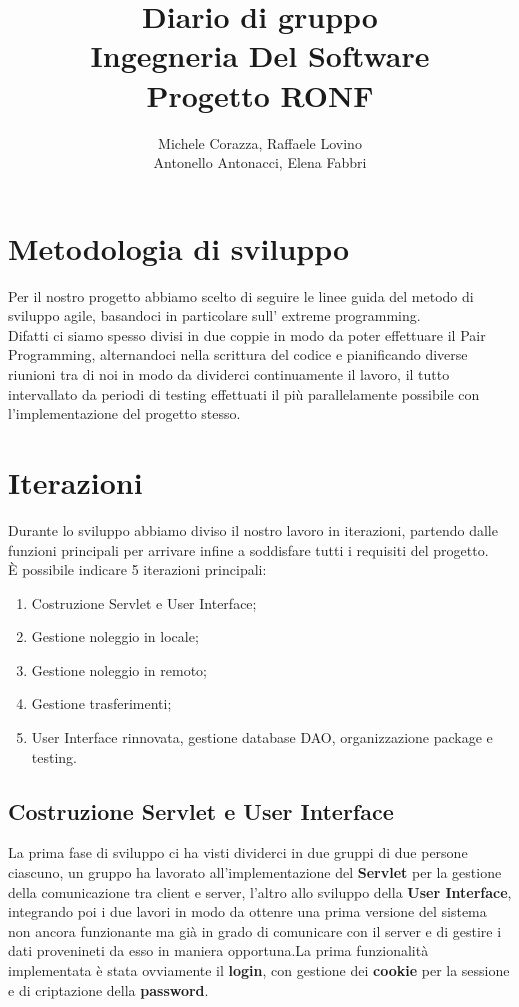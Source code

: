 \documentclass[a4paper,12pt]{article} %
\author{Michele Corazza, Raffaele Lovino\\Antonello Antonacci, Elena Fabbri}
\title{Diario di gruppo\\Ingegneria Del Software\\Progetto RONF}
\begin{document}
\maketitle

\newpage
\section{Metodologia di sviluppo}

Per il nostro progetto abbiamo scelto di seguire le linee guida del metodo di sviluppo agile, basandoci in particolare sull' extreme programming.\\
Difatti ci siamo spesso divisi in due coppie in modo da poter effettuare il Pair Programming, alternandoci nella scrittura del codice e pianificando diverse riunioni tra di noi in modo da dividerci continuamente il lavoro, il tutto intervallato da periodi di testing effettuati il più parallelamente possibile con l'implementazione del progetto stesso.

\section{Iterazioni}
Durante lo sviluppo abbiamo diviso il nostro lavoro in iterazioni, partendo dalle funzioni principali per arrivare infine a soddisfare tutti i requisiti del progetto.\\
È possibile indicare 5 iterazioni principali:
\\
\begin{enumerate}
\item Costruzione Servlet e User Interface;
\item Gestione noleggio in locale;
\item Gestione noleggio in remoto;
\item Gestione trasferimenti;
\item User Interface rinnovata, gestione database DAO, organizzazione package e testing.
\end{enumerate}

\subsection{Costruzione Servlet e User Interface}
La prima fase di sviluppo ci ha visti dividerci in due gruppi di due persone ciascuno, un gruppo ha lavorato all'implementazione del \textbf{Servlet} per la gestione della comunicazione tra client e server, l'altro allo sviluppo della \textbf{User Interface}, integrando poi i due lavori in modo da ottenre una prima versione del sistema non ancora funzionante ma già in grado di comunicare con il server e di gestire i dati provenineti da esso in maniera opportuna.La prima funzionalità implementata è stata ovviamente il \textbf{login}, con gestione dei \textbf{cookie} per la sessione e di criptazione della \textbf{password}.
\end{document}
